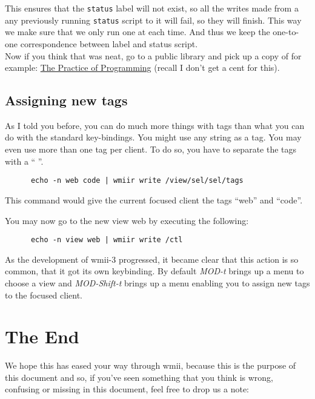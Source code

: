 \documentclass[12pt,a4paper]{article} %
\begin{document}
    This ensures that the \verb+status+ label will not exist, so all
    the writes made from a any previously running \verb+status+ script
    to it will fail, so they will finish. This way we make sure that
    we only run one at each time.  And thus we keep the one-to-one
    correspondence between label and status script.\\
  
    Now if you think that was neat, go to a public library and pick up
    a copy of for example: \href{http://tpop.awl.com}{The Practice of
    Programming} (recall I don't get a cent for this).
  
  \subsection{Assigning new tags}
  
    As I told you before, you can do much more things with tags than
    what you can do with the standard key-bindings. You might use any
    string as a tag. You may even use more than one tag per client. To
    do so, you have to separate the tags with a `` ''.

    \begin{verbatim}
      echo -n web code | wmiir write /view/sel/sel/tags
    \end{verbatim}

    This command would give the current focused client the tags
    ``web'' and ``code''.
    
    You may now go to the new view web by executing the following:

    \begin{verbatim}
      echo -n view web | wmiir write /ctl
    \end{verbatim}

    As the development of wmii-3 progressed, it became clear that this
    action is so common, that it got its own keybinding. By default
    \emph{MOD-t} brings up a menu to choose a view and
    \emph{MOD-Shift-t} brings up a menu enabling you to assign new
    tags to the focused client.

\section{The End}
\label{sec:end}
    
  We hope this has eased your way through wmii, because this is the
  purpose of this document and so, if you've seen something that you
  think is wrong, confusing or missing in this document, feel free
  to drop us a note:
\end{document}
